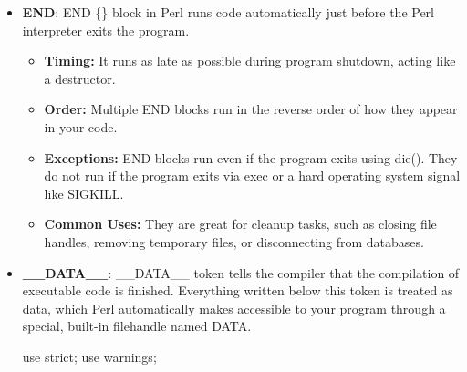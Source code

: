 \documentclass{report}
\begin{document}
\begin{itemize}
\begin{itemize}
                \item \textbf{Purpose:} Commonly used to load modules (use is implemented using BEGIN), define subroutines, or set up global configuration variables before other code compiles.
                \item \textbf{Automatic Deletion:} Once a BEGIN block has run, it is immediately deleted from memory for the rest of the program
            \end{itemize}
            \bigbreak \noindent 
            \begin{perlcode}
                print "2. This runs during runtime.\n";

                BEGIN {
                    print "1. This runs first, during compilation.\n";
                }
            \end{perlcode}
            \bigbreak \noindent 
            \begin{perlcode}
                1. This runs first, during compilation.
                2. This runs during runtime.
            \end{perlcode}
        \item \textbf{END}: END \{\} block in Perl runs code automatically just before the Perl interpreter exits the program.
            \begin{itemize}
                \item \textbf{Timing:} It runs as late as possible during program shutdown, acting like a destructor.
                \item \textbf{Order:} Multiple END blocks run in the reverse order of how they appear in your code.
                \item \textbf{Exceptions:} END blocks run even if the program exits using die(). They do not run if the program exits via exec or a hard operating system signal like SIGKILL.
                \item \textbf{Common Uses:} They are great for cleanup tasks, such as closing file handles, removing temporary files, or disconnecting from databases.
            \end{itemize}
        \item \textbf{\_\_DATA\_\_}: \_\_DATA\_\_ token tells the compiler that the compilation of executable code is finished. Everything written below this token is treated as data, which Perl automatically makes accessible to your program through a special, built-in filehandle named DATA.
            \bigbreak \noindent 
            \begin{perlcode}
                use strict;
                use warnings;


\end{perlcode}
\end{itemize}
\end{document}
